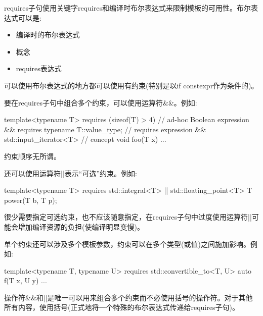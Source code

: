 requires子句使用关键字requires和编译时布尔表达式来限制模板的可用性。布尔表达式可以是:

\begin{itemize}
\item
编译时的布尔表达式

\item
概念

\item
requires表达式
\end{itemize}

可以使用布尔表达式的地方都可以使用有约束(特别是以if constexpr作为条件的)。


要在requires子句中组合多个约束，可以使用运算符\&\&。例如:

\begin{cpp}
template<typename T>
requires (sizeof(T) > 4) // ad-hoc Boolean expression
			&& requires { typename T::value_type; } // requires expression
			&& std::input_iterator<T> // concept
void foo(T x) {
	...
}
\end{cpp}

约束顺序无所谓。

还可以使用运算符||表示“可选”约束。例如:

\begin{cpp}
template<typename T>
requires std::integral<T> || std::floating_point<T>
T power(T b, T p);
\end{cpp}

很少需要指定可选约束，也不应该随意指定，在requires子句中过度使用运算符||可能会增加编译资源的负担(使编译明显变慢)。

单个约束还可以涉及多个模板参数，约束可以在多个类型(或值)之间施加影响。例如:

\begin{cpp}
template<typename T, typename U>
requires std::convertible_to<T, U>
auto f(T x, U y) {
	...
}
\end{cpp}

操作符\&\&和||是唯一可以用来组合多个约束而不必使用括号的操作符。对于其他所有内容，使用括号(正式地将一个特殊的布尔表达式传递给requires子句)。






























